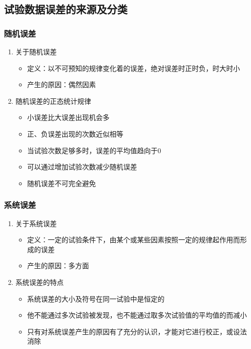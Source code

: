 \documentclass[UTF8]{ctexart}
\begin{document}
\subsection{试验数据误差的来源及分类}
\subsubsection{随机误差}
\begin{enumerate}[•]
\item 关于随机误差
  \begin{itemize}
  \item 定义：以不可预知的规律变化着的误差，绝对误差时正时负，时大时小
  \item 产生的原因：偶然因素
  \end{itemize} 
\item 随机误差的正态统计规律
  \begin{itemize}
  \item 小误差比大误差出现机会多
  \item 正、负误差出现的次数近似相等
  \item 当试验次数足够多时，误差的平均值趋向于0
  \item 可以通过增加试验次数减少随机误差
  \item 随机误差不可完全避免
  \end{itemize} 
\end{enumerate}

\subsubsection{系统误差}
\begin{enumerate}[•]
  \item 关于系统误差
    \begin{itemize}
    \item 定义：一定的试验条件下，由某个或某些因素按照一定的规律起作用而形成的误差
    \item 产生的原因：多方面
    \end{itemize} 
  \item 系统误差的特点
    \begin{itemize}
    \item 系统误差的大小及符号在同一试验中是恒定的
    \item 他不能通过多次试验被发现，也不能通过取多次试验值的平均值的而减小
    \item 只有对系统误差产生的原因有了充分的认识，才能对它进行校正，或设法消除
    \end{itemize} 
  \end{enumerate}
\end{document}
